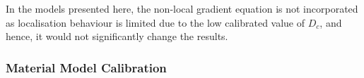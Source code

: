 \documentclass[sn-mathphys,Numbered]{sn-jnl}%
\begin{document}
In the models presented here, the non-local gradient equation is not incorporated as localisation behaviour is limited due to the low calibrated value of $D_c$, and hence, it would not significantly change the results.


\subsubsection{Material Model Calibration}
\end{document}
